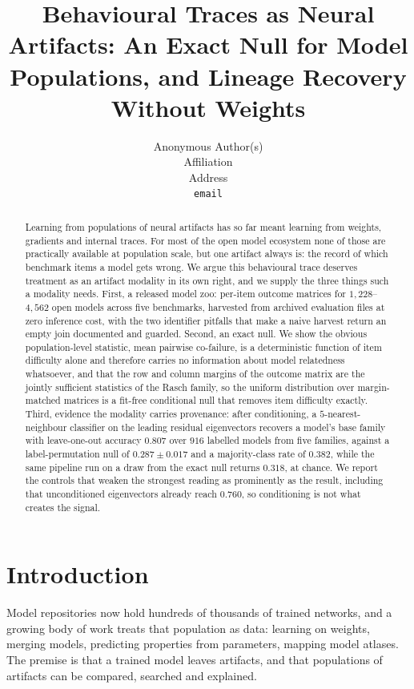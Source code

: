 \documentclass{article}
\title{Behavioural Traces as Neural Artifacts: An Exact Null for Model Populations, and Lineage Recovery Without Weights}
\author{
  Anonymous Author(s) \\
  Affiliation \\
  Address \\
  \texttt{email}
}
\begin{document}
\maketitle

\begin{abstract}
Learning from populations of neural artifacts has so far meant learning from weights, gradients and
internal traces. For most of the open model ecosystem none of those are practically available at
population scale, but one artifact always is: the record of which benchmark items a model gets
wrong. We argue this behavioural trace deserves treatment as an artifact modality in its own right,
and we supply the three things such a modality needs. First, a released model zoo: per-item outcome
matrices for $1{,}228$--$4{,}562$ open models across five benchmarks, harvested from archived
evaluation files at zero inference cost, with the two identifier pitfalls that make a naive harvest
return an empty join documented and guarded. Second, an exact null. We show the obvious
population-level statistic, mean pairwise co-failure, is a deterministic function of item difficulty
alone and therefore carries no information about model relatedness whatsoever, and that the row and
column margins of the outcome matrix are the jointly sufficient statistics of the Rasch family, so
the uniform distribution over margin-matched matrices is a fit-free conditional null that removes
item difficulty exactly. Third, evidence the modality carries provenance: after conditioning, a
$5$-nearest-neighbour classifier on the leading residual eigenvectors recovers a model's base family
with leave-one-out accuracy $0.807$ over $916$ labelled models from five families, against a
label-permutation null of $0.287\pm0.017$ and a majority-class rate of $0.382$, while the same
pipeline run on a draw from the exact null returns $0.318$, at chance. We report the controls that
weaken the strongest reading as prominently as the result, including that unconditioned
eigenvectors already reach $0.760$, so conditioning is not what creates the signal.
\end{abstract}

\section{Introduction}

Model repositories now hold hundreds of thousands of trained networks, and a growing body of work
treats that population as data: learning on weights, merging models, predicting properties from
parameters, mapping model atlases. The premise is that a trained model leaves artifacts, and that
populations of artifacts can be compared, searched and explained.
\end{document}
